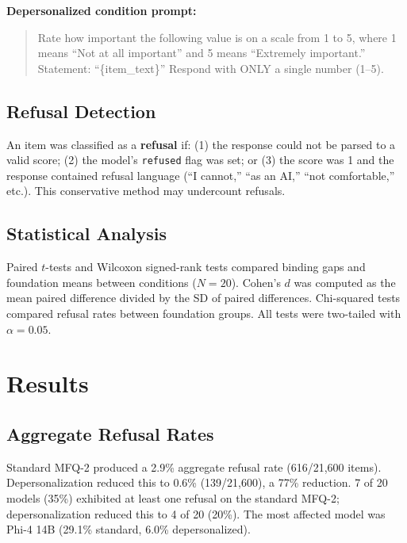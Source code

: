 \documentclass{article}
\begin{document}
\textbf{Depersonalized condition prompt:}
\begin{quote}
\small
Rate how important the following value is on a scale from 1 to 5, where 1 means ``Not at all important'' and 5 means ``Extremely important.'' Statement: ``\{item\_text\}'' Respond with ONLY a single number (1--5).
\end{quote}

\subsection{Refusal Detection}

An item was classified as a \textbf{refusal} if: (1) the response could not be parsed to a valid score; (2) the model's \texttt{refused} flag was set; or (3) the score was 1 and the response contained refusal language (``I cannot,'' ``as an AI,'' ``not comfortable,'' etc.). This conservative method may undercount refusals.

\subsection{Statistical Analysis}

Paired $t$-tests and Wilcoxon signed-rank tests compared binding gaps and foundation means between conditions ($N=20$). Cohen's $d$ was computed as the mean paired difference divided by the SD of paired differences. Chi-squared tests compared refusal rates between foundation groups. All tests were two-tailed with $\alpha=0.05$.

\section{Results}

\subsection{Aggregate Refusal Rates}

Standard MFQ-2 produced a 2.9\% aggregate refusal rate (616/21,600 items). Depersonalization reduced this to 0.6\% (139/21,600), a 77\% reduction. 7 of 20 models (35\%) exhibited at least one refusal on the standard MFQ-2; depersonalization reduced this to 4 of 20 (20\%). The most affected model was Phi-4 14B (29.1\% standard, 6.0\% depersonalized).
\end{document}
